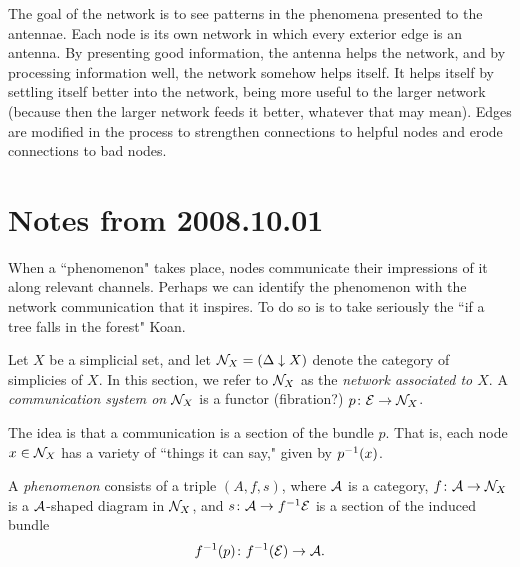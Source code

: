 \documentclass{amsart}
\begin{document}
The goal of the network is to see patterns in the phenomena presented to the antennae.  Each node is its own network in which every exterior edge is an antenna.  By presenting good information, the antenna helps the network, and by processing information well, the network somehow helps itself.  It helps itself by settling itself better into the network, being more useful to the larger network (because then the larger network feeds it better, whatever that may mean).  Edges are modified in the process to strengthen connections to helpful nodes and erode connections to bad nodes.

\section{Notes from 2008.10.01}

When a ``phenomenon" takes place, nodes communicate their impressions of it along relevant channels.  Perhaps we can identify the phenomenon with the network communication that it inspires.  To do so is to take seriously the ``if a tree falls in the forest" Koan.\vspace{.1in}

Let $X$ be a simplicial set, and let $\mathcal{N}_X=(\Delta\downarrow X)$ denote the category of simplicies of $X$.  In this section, we refer to $\mathcal{N}_X$ as the {\em network associated to $X$}.  A {\em communication system on $\mathcal{N}_X$} is a functor (fibration?) $p\colon\mathcal{E}\rightarrow\mathcal{N}_X$.

The idea is that a communication is a section of the bundle $p$.  That is, each node $x\in\mathcal{N}_X$ has a variety of ``things it can say," given by $p^\m1(x)$.  

A {\em phenomenon} consists of a triple $(A,f,s)$, where $\mathcal{A}$ is a category, $f\colon\mathcal{A}\rightarrow\mathcal{N}_X$ is a $\mathcal{A}$-shaped diagram in $\mathcal{N}_X$, and $s\taking\mcA\to f^\m1\mcE$ is a section of the induced bundle $$f^\m1(p)\taking f^\m1(\mcE)\to\mcA.$$
\end{document}
